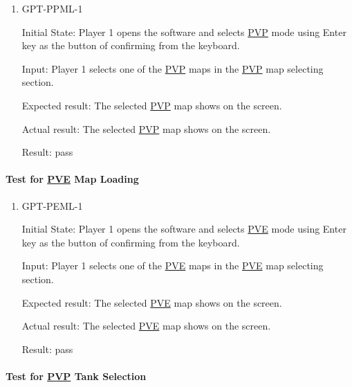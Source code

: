 \documentclass[12pt, titlepage]{article}
\begin{document}
\begin{enumerate}

\item{GPT-PPML-1\\}
					
Initial State: Player 1 opens the software and selects \underline{PVP} mode using Enter key as the button of confirming from the keyboard.
					
Input: Player 1 selects one of the \underline{PVP} maps in the \underline{PVP} map selecting section.
					
Expected result: The selected \underline{PVP} map shows on the screen.
					
Actual result: The selected \underline{PVP} map shows on the screen.

Result: pass

\end{enumerate}

\paragraph{Test for \underline{PVE} Map Loading}

\begin{enumerate}

\item{GPT-PEML-1\\}
					
Initial State: Player 1 opens the software and selects \underline{PVE} mode using Enter key as the button of confirming from the keyboard.
					
Input: Player 1 selects one of the \underline{PVE} maps in the \underline{PVE} map selecting section.
					
Expected result: The selected \underline{PVE} map shows on the screen.
					
Actual result: The selected \underline{PVE} map shows on the screen.

Result: pass

\end{enumerate}

\paragraph{Test for \underline{PVP} Tank Selection}
\end{document}
